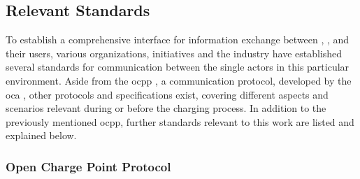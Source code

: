 \subsection{Relevant Standards}
\label{ch:Fundamentals:sec:Electric Mobility:ssec:Relevant Standards}

To establish a comprehensive interface for information exchange between , , and their users, various organizations, initiatives and the industry have established several standards for communication between the single actors in this particular environment.
Aside from the \acrfull{ocpp} \cite{noauthor_ocpp_nodate}, a communication protocol, developed by the \acrfull{oca} \cite{noauthor_open_nodate}, other protocols and specifications exist, covering different aspects and scenarios relevant during or before the charging process.
In addition to the previously mentioned \acrshort{ocpp}, further standards relevant to this work are listed and explained below.

\subsubsection{Open Charge Point Protocol}
\label{ch:Fundamentals:sec:Electric Mobility:ssec:Relevant Standards:sssec:OCPP}

